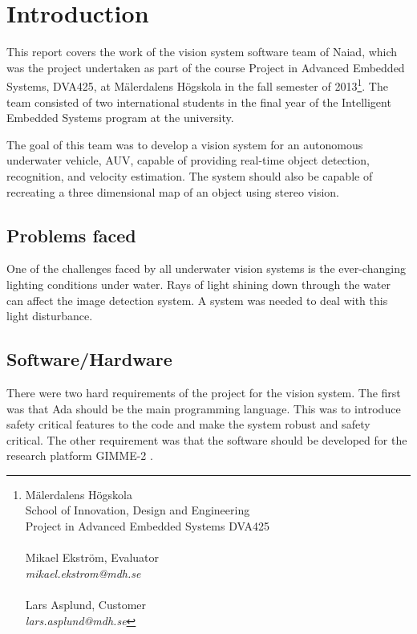 \section{Introduction}\label{sec:introduction}
This report covers the work of the vision system software team of Naiad\cite{web:naiad}, which was the project undertaken as part of the course Project in Advanced Embedded Systems, DVA425, at M\"{a}lerdalens H\"{o}gskola in the fall semester of 2013\footnote{M\"{a}lerdalens H\"{o}gskola \\School of Innovation, Design and Engineering\\Project in Advanced Embedded Systems DVA425\\ \\Mikael Ekstr\"{o}m, Evaluator \\ \textit{mikael.ekstrom@mdh.se}\\ \\Lars Asplund, Customer\\ \textit{lars.asplund@mdh.se}}. The team consisted of two international students in the final year of the Intelligent Embedded Systems program at the university.

The goal of this team was to develop a vision system for an autonomous underwater vehicle, AUV, capable of providing real-time object detection, recognition, and velocity estimation. The system should also be capable of recreating a three dimensional map of an object using stereo vision.

\subsection{Problems faced}
One of the challenges faced by all underwater vision systems is the ever-changing lighting conditions under water. Rays of light shining down through the water can affect the image detection system. A system was needed to deal with this light disturbance.

\subsection{Software/Hardware}
There were two hard requirements of the project for the vision system. The first was that Ada should be the main programming language. This was to introduce safety critical features to the code and make the system robust and safety critical. The other requirement was that the software should be developed for the research platform GIMME-2 \cite{web:GIMME2}. 

